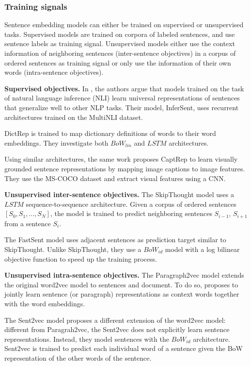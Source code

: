 \subsubsection{Training signals}
Sentence embedding models can either be trained on supervised or unsupervised tasks. Supervised models are trained on corpora of labeled sentences, and use sentence labels as training signal. Unsupervised models either use the context information of neighboring sentences (inter-sentence objectives) in a corpus of ordered sentences as training signal or only use the information of their own words (intra-sentence objectives).

\textbf{Supervised objectives.} In \cite{conneau2017supervised}, the authors argue that models trained on the task of natural language inference (NLI) learn universal representations of sentences that generalize well to other NLP tasks. Their model, InferSent, uses recurrent architectures trained on the MultiNLI dataset.

DictRep \cite{hill2015learning} is trained to map dictionary definitions of words to their word embeddings. They investigate both $BoW_{lin}$ and $LSTM$ architectures.

Using similar architectures, the same work proposes CaptRep to learn visually grounded sentence representations by mapping image captions to image features. They use the MS-COCO dataset and extract visual features using a CNN.

\textbf{Unsupervised inter-sentence objectives.} The SkipThought model \cite{kiros2015skip} uses a $LSTM$ sequence-to-sequence architecture. Given a corpus of ordered sentences $[S_0, S_1, ..., S_N]$, the model is trained to predict neighboring sentences $S_{i-1}$, $S_{i+1}$ from a sentence $S_i$.

The FastSent model \cite{hill2016learning} uses adjacent sentences as prediction target similar to SkipThought. Unlike SkipThought, they use a $BoW_{id}$ model with a log bilinear objective function to speed up the training process.

\textbf{Unsupervised intra-sentence objectives.} The Paragraph2vec model \cite{le2014distributed} extends the original word2vec model to sentences and document. To do so, \cite{le2014distributed} proposes to jointly learn sentence (or paragraph) representations as context words together with the word embeddings. 

The Sent2vec \cite{pagliardini2017unsupervised} model proposes a different extension of the word2vec model: different from Paragrah2vec, the Sent2vec does not explicitly learn sentence representations. Instead, they model sentences with the $BoW_{id}$ architecture. Sent2vec is trained to predict each individual word of a sentence given the BoW representation of the other words of the sentence.	

